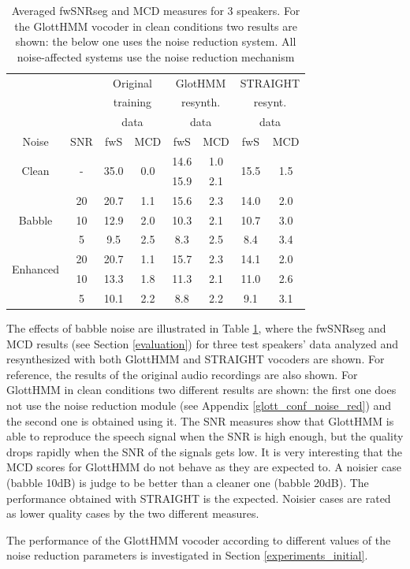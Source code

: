 \begin{table}[!htb]
\begin{centering}
\begin{tabular}{c c|c c|c c|c c}
	 & & \multicolumn{2}{c|}{Original} & \multicolumn{2}{c|}{GlotHMM} & \multicolumn{2}{c}{STRAIGHT}\\
	 & & \multicolumn{2}{c|}{training} & \multicolumn{2}{c|}{resynth.} & \multicolumn{2}{c}{resynt.}\\
	 & & \multicolumn{2}{c|}{data} & \multicolumn{2}{c|}{data} & \multicolumn{2}{c}{data}\\
	Noise & SNR & fwS & MCD & fwS & MCD & fwS & MCD\\
	\midrule
	\midrule
	\multirow{2}{*}{Clean} & \multirow{2}{*}{-} & \multirow{2}{*}{35.0} & \multirow{2}{*}{0.0} & 14.6 & 1.0 & \multirow{2}{*}{15.5} & \multirow{2}{*}{1.5}\\
	 & & & & 15.9 & 2.1 & & \\	
	\midrule
	\multirow{3}{*}{Babble} & 20 & 20.7 & 1.1 & 15.6 & 2.3 & 14.0 & 2.0\\
	 & 10 & 12.9 & 2.0 & 10.3 & 2.1 & 10.7 & 3.0\\
	 & 5 & 9.5 & 2.5 & 8.3 & 2.5 & 8.4 & 3.4\\
	\midrule
	\midrule
	\multirow{2}{*}{Enhanced} & 20 & 20.7 & 1.1 & 15.7 & 2.3 & 14.1 & 2.0\\
	\multirow{2}{*}{Babble} & 10 & 13.3 & 1.8 & 11.3 & 2.1 & 11.0 & 2.6\\
	 & 5 & 10.1 & 2.2 & 8.8 & 2.2 & 9.1 & 3.1\\
	\bottomrule
\end{tabular}
\caption{Averaged fwSNRseg and MCD measures for 3 speakers. For the GlottHMM vocoder in clean conditions two results are shown: the below one uses the noise reduction system. All noise-affected systems use the noise reduction mechanism}
\label{table:an_resyn_results}
\end{centering}
\end{table}

The effects of babble noise are illustrated in Table \ref{table:an_resyn_results}, where the fwSNRseg and MCD results (see Section \ref{evaluation}) for three test speakers' data analyzed and resynthesized with both GlottHMM and STRAIGHT vocoders are shown.
%
For reference, the results of the original audio recordings are also shown.
%
For GlottHMM in clean conditions two different results are shown: the first one does not use the noise reduction module (see Appendix \ref{glott_conf_noise_red}) and the second one is obtained using it.
%
The SNR measures show that GlottHMM is able to reproduce the speech signal when the SNR is high enough, but the quality drops rapidly when the SNR of the signals gets low.
%
It is very interesting that the MCD scores for GlottHMM do not behave as they are expected to.
%
A noisier case (babble 10dB) is judge to be better than a cleaner one (babble 20dB).
%
The performance obtained with STRAIGHT is the expected.
%
Noisier cases are rated as lower quality cases by the two different measures.

The performance of the GlottHMM vocoder according to different values of the noise reduction parameters is investigated in Section \ref{experiments_initial}.
